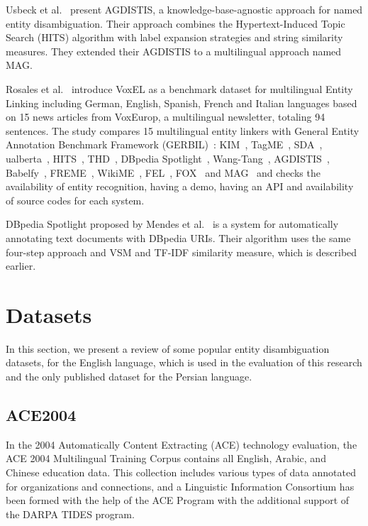 \documentclass{article}
\begin{document}
Usbeck et al.~\cite{usbeck2014agdistis} present AGDISTIS, a knowledge-base-agnostic approach for named entity disambiguation. Their approach combines the Hypertext-Induced Topic Search (HITS) algorithm with label expansion strategies and string similarity measures. They extended their AGDISTIS to a multilingual approach named MAG\cite{moussallem2017mag}.

Rosales et al.~\cite{rosales2018voxel} introduce VoxEL as a benchmark dataset for multilingual Entity Linking
including German, English, Spanish, French and Italian languages based on 15 news articles
from VoxEurop, a multilingual newsletter, totaling 94 sentences.
The study compares 15 multilingual entity linkers with General Entity Annotation Benchmark Framework (GERBIL)~\cite{usbeck2015gerbil}:
KIM~\cite{popov2004kim},
TagME~\cite{ferragina2010tagme},
SDA~\cite{charton2011automatic},
ualberta~\cite{guo2012ualberta},
HITS~\cite{fahrni2012hits},
THD~\cite{dojchinovski2012recognizing},
DBpedia Spotlight~\cite{mendes2011dbpedia,daiber2013improving},
Wang-Tang~\cite{wang2013boosting},
AGDISTIS~\cite{usbeck2014agdistis},
Babelfy~\cite{moro2014entity},
FREME~\cite{sasaki2016chainable},
WikiME~\cite{tsai2016cross},
FEL~\cite{pappu2017lightweight},
FOX~\cite{speck2017ensemble} and
MAG~\cite{moussallem2017mag}
and checks the availability of entity recognition, having a demo, having an API and availability of source codes for each system.

DBpedia Spotlight proposed by Mendes et al.~\cite{mendes2011dbpedia} is a system for automatically annotating text documents with DBpedia URIs. Their algorithm uses the same four-step approach and VSM and TF-IDF similarity measure, which is described earlier.

\section{Datasets}
\label{subsec:dataset-sec}
In this section, we present a review of some popular entity disambiguation datasets, for the English language, which is used in the evaluation of this research and the only published dataset for the Persian language.

\subsection{ACE2004}
In the 2004 Automatically Content Extracting (ACE) technology evaluation, the ACE 2004 Multilingual Training Corpus contains all English, Arabic, and Chinese education data. This collection includes various types of data annotated for organizations and connections, and a Linguistic Information Consortium has been formed with the help of the ACE Program with the additional support of the DARPA TIDES program.
\end{document}
